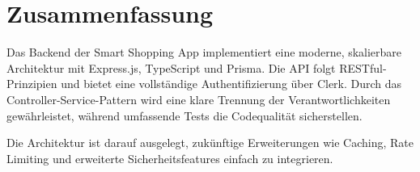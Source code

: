 \section{Zusammenfassung}

Das Backend der Smart Shopping App implementiert eine moderne, skalierbare Architektur mit Express.js, TypeScript und Prisma. Die API folgt RESTful-Prinzipien und bietet eine vollständige Authentifizierung über Clerk. Durch das Controller-Service-Pattern wird eine klare Trennung der Verantwortlichkeiten gewährleistet, während umfassende Tests die Codequalität sicherstellen.

Die Architektur ist darauf ausgelegt, zukünftige Erweiterungen wie Caching, Rate Limiting und erweiterte Sicherheitsfeatures einfach zu integrieren.

\cleardoublepage

